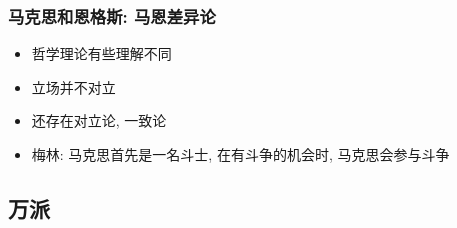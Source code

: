 \documentclass[11pt]{article}
\begin{document}
\subsubsection{马克思和恩格斯: 马恩差异论}
\label{sec:orgee5dc6c}

\begin{itemize}
\item 哲学理论有些理解不同
\item 立场并不对立
\item 还存在对立论, 一致论
\item 梅林: 马克思首先是一名斗士, 在有斗争的机会时, 马克思会参与斗争
\end{itemize}

\subsection{万派}
\label{sec:org94a3791}
\end{document}
